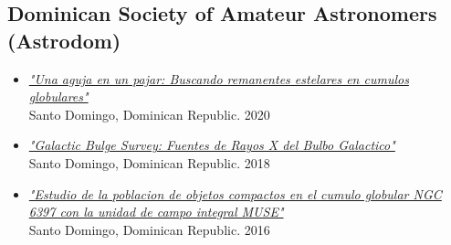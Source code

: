 \documentclass[letterpaper,10pt]{article}
\begin{document}
\subsection*{Dominican Society of Amateur Astronomers (Astrodom)}

\begin{itemize}[label=$\blacktriangleright$]


    \item \textit{\href{https://manuelpm.me/AstrodomJulio2020/}{"Una aguja en un pajar: Buscando remanentes estelares en cumulos globulares"}} \\ Santo Domingo, Dominican Republic. 2020


	\item \textit{\href{http://manuelpm.me/AstrodomGBStalk/}{"Galactic Bulge Survey: Fuentes de Rayos X del Bulbo Galactico"}} \\ Santo Domingo, Dominican Republic. 2018



	\item \textit{\href{http://manuelpm.me/Astrodomtalk/}{"Estudio de la poblacion de objetos compactos en el cumulo globular NGC 6397 con la unidad de campo integral MUSE"}} \\Santo Domingo, Dominican Republic. 2016

\end{itemize}






%
%
\end{document}
